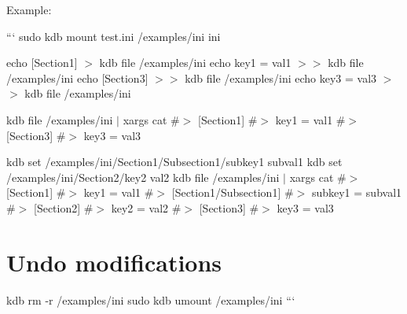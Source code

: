 Example\+:

``` sudo kdb mount test.\+ini /examples/ini ini

echo \textquotesingle{}\mbox{[}Section1\mbox{]}\textquotesingle{} $>$ {\ttfamily kdb file /examples/ini} echo \textquotesingle{}key1 = val1\textquotesingle{} $>$$>$ {\ttfamily kdb file /examples/ini} echo \textquotesingle{}\mbox{[}Section3\mbox{]}\textquotesingle{} $>$$>$ {\ttfamily kdb file /examples/ini} echo \textquotesingle{}key3 = val3\textquotesingle{} $>$$>$ {\ttfamily kdb file /examples/ini}

kdb file /examples/ini $\vert$ xargs cat \#$>$ \mbox{[}Section1\mbox{]} \#$>$ key1 = val1 \#$>$ \mbox{[}Section3\mbox{]} \#$>$ key3 = val3

kdb set /examples/ini/\+Section1/\+Subsection1/subkey1 subval1 kdb set /examples/ini/\+Section2/key2 val2 kdb file /examples/ini $\vert$ xargs cat \#$>$ \mbox{[}Section1\mbox{]} \#$>$ key1 = val1 \#$>$ \mbox{[}Section1/\+Subsection1\mbox{]} \#$>$ subkey1 = subval1 \#$>$ \mbox{[}Section2\mbox{]} \#$>$ key2 = val2 \#$>$ \mbox{[}Section3\mbox{]} \#$>$ key3 = val3

\section*{Undo modifications}

kdb rm -\/r /examples/ini sudo kdb umount /examples/ini ``` 